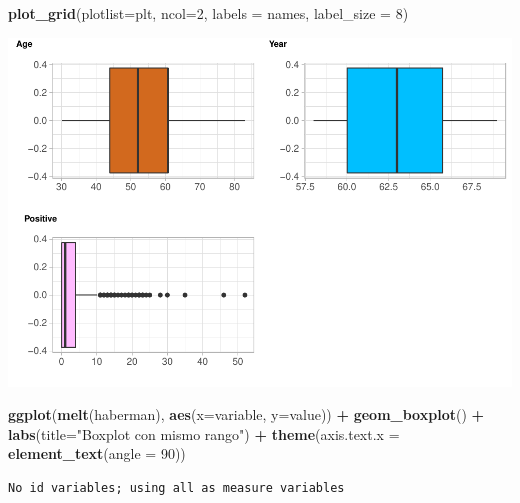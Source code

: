 \documentclass[
]{article}
\newenvironment{Shaded}{\begin{snugshade}}{\end{snugshade}}
\newcommand{\DataTypeTok}[1]{\textcolor[rgb]{0.13,0.29,0.53}{#1}}
\newcommand{\DecValTok}[1]{\textcolor[rgb]{0.00,0.00,0.81}{#1}}
\newcommand{\KeywordTok}[1]{\textcolor[rgb]{0.13,0.29,0.53}{\textbf{#1}}}
\newcommand{\NormalTok}[1]{#1}
\newcommand{\OperatorTok}[1]{\textcolor[rgb]{0.81,0.36,0.00}{\textbf{#1}}}
\newcommand{\StringTok}[1]{\textcolor[rgb]{0.31,0.60,0.02}{#1}}
\begin{document}
\begin{Shaded}
\begin{Highlighting}[]
\KeywordTok{plot_grid}\NormalTok{(}\DataTypeTok{plotlist=}\NormalTok{plt, }\DataTypeTok{ncol=}\DecValTok{2}\NormalTok{, }\DataTypeTok{labels =}\NormalTok{ names, }\DataTypeTok{label_size =} \DecValTok{8}\NormalTok{)}
\end{Highlighting}
\end{Shaded}

\begin{center}\includegraphics{EDA2_files/figure-latex/unnamed-chunk-11-4} \end{center}

\begin{Shaded}
\begin{Highlighting}[]
\KeywordTok{ggplot}\NormalTok{(}\KeywordTok{melt}\NormalTok{(haberman), }\KeywordTok{aes}\NormalTok{(}\DataTypeTok{x=}\NormalTok{variable, }\DataTypeTok{y=}\NormalTok{value)) }\OperatorTok{+}\StringTok{ }
\StringTok{  }\KeywordTok{geom_boxplot}\NormalTok{() }\OperatorTok{+}
\StringTok{  }\KeywordTok{labs}\NormalTok{(}\DataTypeTok{title=}\StringTok{"Boxplot con mismo rango"}\NormalTok{) }\OperatorTok{+}
\StringTok{  }\KeywordTok{theme}\NormalTok{(}\DataTypeTok{axis.text.x =} \KeywordTok{element_text}\NormalTok{(}\DataTypeTok{angle =} \DecValTok{90}\NormalTok{))}
\end{Highlighting}
\end{Shaded}

\begin{verbatim}
No id variables; using all as measure variables
\end{verbatim}
\end{document}

